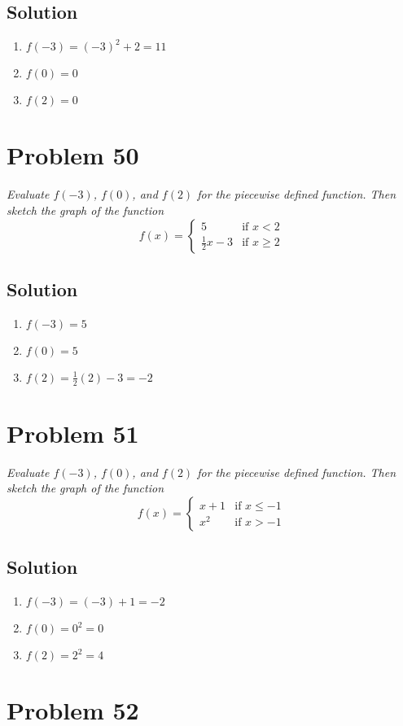 \documentclass[11pt]{article}
\newcommand{\soln}{\subsection*}
\newcommand{\qn}{\textit}
\begin{document}
\soln{Solution}
\begin{enumerate}
	\item $f(-3)=(-3)^2+2=11$
	\item $f(0)=0$
	\item $f(2)=0$
\end{enumerate}

\section*{Problem 50}

\qn{Evaluate $f(-3)$, $f(0)$, and $f(2)$ for the piecewise defined function. Then sketch the graph of the function}
\begin{equation*}
	f(x)=
	\begin{cases}
		5 & \text{if } x < 2\\
		\frac{1}{2}x-3 & \text{if } x \ge 2
	\end{cases}
\end{equation*}

\soln{Solution}
\begin{enumerate}
	\item $f(-3)=5$
	\item $f(0)=5$
	\item $f(2)=\frac{1}{2}(2)-3=-2$
\end{enumerate}

\section*{Problem 51}

\qn{Evaluate $f(-3)$, $f(0)$, and $f(2)$ for the piecewise defined function. Then sketch the graph of the function}
\begin{equation*}
	f(x)=
	\begin{cases}
		x+1 & \text{if } x \le -1\\
		x^2 & \text{if } x > -1
	\end{cases}
\end{equation*}

\soln{Solution}
\begin{enumerate}
	\item $f(-3)=(-3)+1=-2$
	\item $f(0)=0^2=0$
	\item $f(2)=2^2=4$
\end{enumerate}

\section*{Problem 52}
\end{document}
